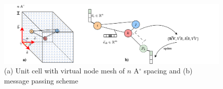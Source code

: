 \documentclass{lxaiproposal}
\begin{document}
\begin{figure}[H]
    \centering
    \includegraphics[width=\linewidth]{unitcell-vn.drawio.png}
    \caption{(a) Unit cell with virtual node mesh of $n$ A$^\circ$ spacing and (b) message passing scheme}
    \label{fig:unitcellmp}
\end{figure}

\newpage



\end{document}
